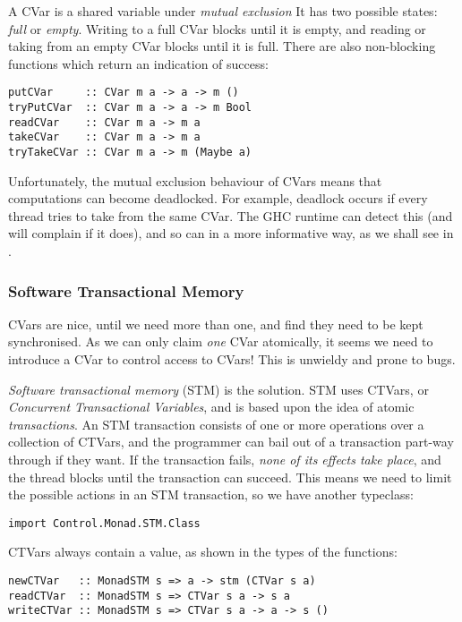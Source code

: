 A CVar is a shared variable under \textit{mutual exclusion} It has two
possible states: \textit{full} or \textit{empty}. Writing to a full
CVar blocks until it is empty, and reading or taking from an empty
CVar blocks until it is full. There are also non-blocking functions
which return an indication of success:

\begin{verbatim}
putCVar     :: CVar m a -> a -> m ()
tryPutCVar  :: CVar m a -> a -> m Bool
readCVar    :: CVar m a -> m a
takeCVar    :: CVar m a -> m a
tryTakeCVar :: CVar m a -> m (Maybe a)
\end{verbatim}

Unfortunately, the mutual exclusion behaviour of CVars means that
computations can become deadlocked. For example, deadlock occurs if
every thread tries to take from the same CVar. The GHC runtime can
detect this (and will complain if it does), and so can \dejafu{} in a
more informative way, as we shall see in .

\subsubsection*{Software Transactional Memory}
\label{sec:prelims-dejafu-conc-stm}

CVars are nice, until we need more than one, and find they need to be
kept synchronised. As we can only claim \textit{one} CVar atomically,
it seems we need to introduce a CVar to control access to CVars! This
is unwieldy and prone to bugs.

\textit{Software transactional memory} (STM) is the solution. STM uses
CTVars, or \textit{Concurrent Transactional Variables}, and is based
upon the idea of atomic \textit{transactions}. An STM transaction
consists of one or more operations over a collection of CTVars, and
the programmer can bail out of a transaction part-way through if they
want. If the transaction fails, \textit{none of its effects take
  place}, and the thread blocks until the transaction can
succeed. This means we need to limit the possible actions in an STM
transaction, so we have another typeclass:

\begin{verbatim}
import Control.Monad.STM.Class
\end{verbatim}

CTVars always contain a value, as shown in the types of the functions:

\begin{verbatim}
newCTVar   :: MonadSTM s => a -> stm (CTVar s a)
readCTVar  :: MonadSTM s => CTVar s a -> s a
writeCTVar :: MonadSTM s => CTVar s a -> a -> s ()
\end{verbatim}

